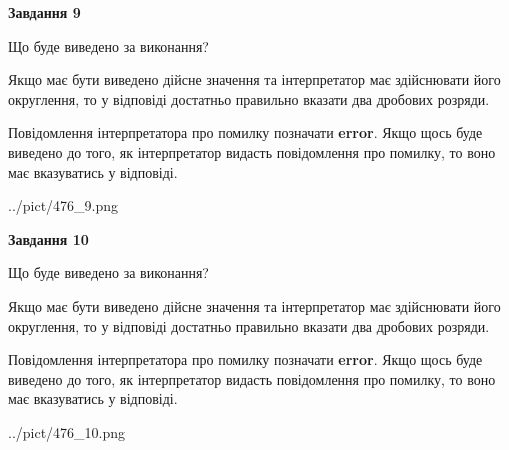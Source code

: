 \documentclass[12pt, ukrainian]{article}
\begin{document}
{\begin {Large}
{\begin {center}\textbf{Завдання 9}\end {center}}\par
Що буде виведено за виконання? \par

Якщо має бути виведено дійсне значення та інтерпретатор має здійснювати його округлення, 
то у відповіді достатньо правильно вказати два дробових розряди.

Повідомлення інтерпретатора про помилку позначати \textbf{error}.
Якщо щось буде виведено до того, як інтерпретатор видасть повідомлення про помилку, 
то воно має вказуватись у відповіді. \par

\begin{center}
	{../pict/476_9.png}
\end{center}
\newpage

{\begin {center}\textbf{Завдання 10}\end {center}}\par
Що буде виведено за виконання? \par

Якщо має бути виведено дійсне значення та інтерпретатор має здійснювати його округлення, 
то у відповіді достатньо правильно вказати два дробових розряди.

Повідомлення інтерпретатора про помилку позначати \textbf{error}.
Якщо щось буде виведено до того, як інтерпретатор видасть повідомлення про помилку, 
то воно має вказуватись у відповіді. \par

\begin{center}
	{../pict/476_10.png}
\end{center}
\newpage

\end {Large}}
\end{document}
